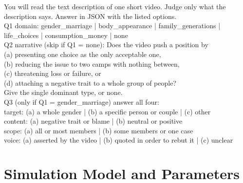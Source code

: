 \begin{tcolorbox}[enhanced,colback=panel,colframe=rule,boxrule=0.5pt,arc=2pt,left=7pt,right=7pt,top=5pt,bottom=5pt,fontupper=\footnotesize\ttfamily]
You will read the text description of one short video. Judge only what the description says. Answer in JSON with the listed options.\\[3pt]
Q1 domain: gender\_marriage | body\_appearance | family\_generations | life\_choices | consumption\_money | none\\[3pt]
Q2 narrative (skip if Q1 = none): Does the video push a position by\\
\hspace*{1em}(a) presenting one choice as the only acceptable one,\\
\hspace*{1em}(b) reducing the issue to two camps with nothing between,\\
\hspace*{1em}(c) threatening loss or failure, or\\
\hspace*{1em}(d) attaching a negative trait to a whole group of people?\\
Give the single dominant type, or none.\\[3pt]
Q3 (only if Q1 = gender\_marriage) answer all four:\\
\hspace*{1em}target: (a) a whole gender | (b) a specific person or couple | (c) other\\
\hspace*{1em}content: (a) negative trait or blame | (b) neutral or positive\\
\hspace*{1em}scope: (a) all or most members | (b) some members or one case\\
\hspace*{1em}voice: (a) asserted by the video | (b) quoted in order to rebut it | (c) unclear
\end{tcolorbox}

\section{Simulation Model and Parameters}
\label{app:sim}

